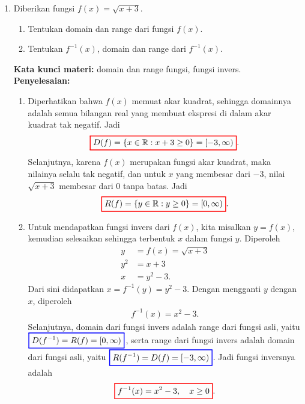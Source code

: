 \documentclass[10pt,openany,a4paper]{article}
\theoremstyle{definition}
\theoremstyle{definition}
\theoremstyle{plain}
\newenvironment{jawab}[2][tes]{%
\par\noindent\textbf{Kata kunci materi:} #1.\\
\textbf{Penyelesaian:} #2%
}{}
\begin{document}
\begin{enumerate}
    \item Diberikan fungsi $f(x)=\sqrt{x+3}$.
    \begin{enumerate}
        \item Tentukan domain dan range dari fungsi $f(x)$.
        \item Tentukan $f^{-1}(x)$, domain dan range dari $f^{-1}(x)$.
    \end{enumerate}
    \begin{jawab}[domain dan range fungsi, fungsi invers]{
        \begin{enumerate}
            \item Diperhatikan bahwa $f(x)$ memuat akar kuadrat, sehingga domainnya adalah semua bilangan real yang membuat ekspresi di dalam akar kuadrat tak negatif. Jadi
            \begin{align*}
                \colorlet{oldcolor}{.}
        \color{red}
        \setlength{\fboxrule}{1pt} \boxed{\color{oldcolor}D(f)=\{x \in \mathbb{R} : x+3 \geq 0\} = [-3, \infty)}\color{oldcolor}.
            \end{align*}
            Selanjutnya, karena $f(x)$ merupakan fungsi akar kuadrat, maka nilainya selalu tak negatif, dan untuk $x$ yang membesar dari $-3$, nilai $\sqrt{x+3}$ membesar dari $0$ tanpa batas. Jadi
            \begin{align*}
                \colorlet{oldcolor}{.}
        \color{red}
        \setlength{\fboxrule}{1pt} \boxed{\color{oldcolor}R(f)=\{y \in \mathbb{R} : y \geq 0\} = [0, \infty)}\color{oldcolor}.
            \end{align*}
            \item Untuk mendapatkan fungsi invers dari $f(x)$, kita misalkan $y=f(x)$, kemudian selesaikan sehingga terbentuk $x$ dalam fungsi $y$. Diperoleh
            \begin{align*}
                y &= f(x) = \sqrt{x+3}\\
                y^2 &= x+3\\
                x &= y^2 - 3.
            \end{align*}
            Dari sini didapatkan $x = f^{-1}(y) = y^2 - 3$. Dengan mengganti $y$ dengan $x$, diperoleh
            \begin{align*}
                f^{-1}(x) = x^2 - 3.
            \end{align*}
            Selanjutnya, domain dari fungsi invers adalah range dari fungsi asli, yaitu $\colorlet{oldcolor}{.}
        \color{blue}
        \setlength{\fboxrule}{1pt} \boxed{\color{oldcolor}D(f^{-1}) = R(f) = [0, \infty)}\color{oldcolor}$, serta range dari fungsi invers adalah domain dari fungsi asli, yaitu $\colorlet{oldcolor}{.}
        \color{blue}
        \setlength{\fboxrule}{1pt} \boxed{\color{oldcolor}R(f^{-1}) = D(f) = [-3, \infty)}\color{oldcolor}$. Jadi fungsi inversnya adalah
        \begin{align*}
            \colorlet{oldcolor}{.}
        \color{red}
        \setlength{\fboxrule}{1pt} \boxed{\color{oldcolor}f^{-1}(x) = x^2 - 3,\quad x\geq 0}\color{oldcolor}.
        \end{align*}
        \end{enumerate}
    }
    \end{jawab}


\end{enumerate}
\end{document}
